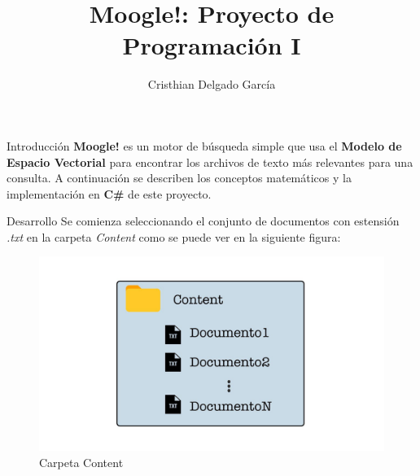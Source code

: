 \documentclass{beamer}
\title{Moogle!: Proyecto de Programación I}
\author{Cristhian Delgado García}
\date{}
\begin{document}
\newcommand{\class}[1]{\textcolor{cyan_opaco}{\texttt{#1}}}
\newcommand{\keyword}[1]{\textcolor{blue_opaco}{\texttt{#1}}}
\begin{frame}
\maketitle
\end{frame}

\begin{frame}{Introducción}
    \textbf{Moogle!} es un motor de búsqueda simple que usa el \textbf{Modelo de Espacio Vectorial} para encontrar los archivos de texto más relevantes para una consulta. A continuación se describen los conceptos matemáticos y la implementación en \textbf{C\#} de este proyecto.

\end{frame}
\begin{frame}{Desarrollo}
Se comienza seleccionando el conjunto de documentos con estensión \textit{.txt} en la carpeta \textit{Content} como se puede ver en la siguiente figura:
\begin{figure}
    \centering
    \includegraphics[width=0.5\linewidth]{content.jpg}
    \caption{Carpeta Content}
\end{figure}
\end{frame}
\end{document}
